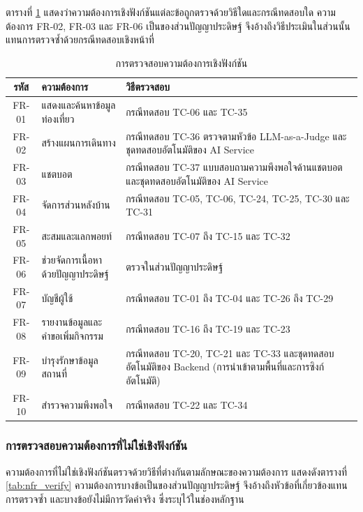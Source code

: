 ตารางที่ \ref{tab:fr_coverage} แสดงว่าความต้องการเชิงฟังก์ชันแต่ละข้อถูกตรวจด้วยวิธีใดและกรณีทดสอบใด ความต้องการ FR-02, FR-03 และ FR-06 เป็นของส่วนปัญญาประดิษฐ์ จึงอ้างถึงวิธีประเมินในส่วนนั้นแทนการตรวจซ้ำด้วยกรณีทดสอบเชิงหน้าที่

\nopagebreak
\begin{table}[H]
\centering
\caption{การตรวจสอบความต้องการเชิงฟังก์ชัน}
\label{tab:fr_coverage}
\begin{tabular}{|c|p{4.2cm}|p{6.4cm}|}
\hline
\textbf{รหัส} & \textbf{ความต้องการ} & \textbf{วิธีตรวจสอบ} \\
\hline
FR-01 & แสดงและค้นหาข้อมูลท่องเที่ยว & กรณีทดสอบ TC-06 และ TC-35 \\ \hline
FR-02 & สร้างแผนการเดินทาง & กรณีทดสอบ TC-36 ตรวจตามหัวข้อ LLM-as-a-Judge และชุดทดสอบอัตโนมัติของ AI Service \\ \hline
FR-03 & แชตบอต & กรณีทดสอบ TC-37 แบบสอบถามความพึงพอใจด้านแชตบอต และชุดทดสอบอัตโนมัติของ AI Service \\ \hline
FR-04 & จัดการส่วนหลังบ้าน & กรณีทดสอบ TC-05, TC-06, TC-24, TC-25, TC-30 และ TC-31 \\ \hline
FR-05 & สะสมและแลกพอยท์ & กรณีทดสอบ TC-07 ถึง TC-15 และ TC-32 \\ \hline
FR-06 & ช่วยจัดการเนื้อหาด้วยปัญญาประดิษฐ์ & ตรวจในส่วนปัญญาประดิษฐ์ \\ \hline
FR-07 & บัญชีผู้ใช้ & กรณีทดสอบ TC-01 ถึง TC-04 และ TC-26 ถึง TC-29 \\ \hline
FR-08 & รายงานข้อมูลและคำขอเพิ่มกิจกรรม & กรณีทดสอบ TC-16 ถึง TC-19 และ TC-23 \\ \hline
FR-09 & บำรุงรักษาข้อมูลสถานที่ & กรณีทดสอบ TC-20, TC-21 และ TC-33 และชุดทดสอบอัตโนมัติของ Backend (การนำเข้าตามพื้นที่และการซิงก์อัตโนมัติ) \\ \hline
FR-10 & สำรวจความพึงพอใจ & กรณีทดสอบ TC-22 และ TC-34 \\
\hline
\end{tabular}
\end{table}

\subsubsection{การตรวจสอบความต้องการที่ไม่ใช่เชิงฟังก์ชัน}

ความต้องการที่ไม่ใช่เชิงฟังก์ชันตรวจด้วยวิธีที่ต่างกันตามลักษณะของความต้องการ แสดงดังตารางที่ \ref{tab:nfr_verify} ความต้องการบางข้อเป็นของส่วนปัญญาประดิษฐ์ จึงอ้างถึงหัวข้อที่เกี่ยวข้องแทนการตรวจซ้ำ และบางข้อยังไม่มีการวัดค่าจริง ซึ่งระบุไว้ในช่องหลักฐาน

